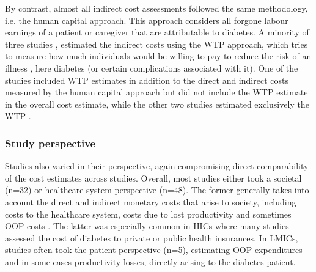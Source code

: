 By contrast, almost all indirect cost assessments followed the same methodology, i.e. the human capital approach. This approach considers all forgone labour earnings of a patient or caregiver that are attributable to diabetes. A minority of three studies \parencite{Tharkar2010a,Chang2010b,Gyldmark2001}, estimated the indirect costs using the \ac{WTP} approach, which tries to measure how much individuals would be willing to pay to reduce the risk of an illness \parencite{Segel2006}, here diabetes (or certain complications associated with it). One of the studies included \ac{WTP} estimates in addition to the direct and indirect costs measured by the human capital approach \parencite{Tharkar2010a}\DIFaddbegin \DIFadd{, }\DIFaddend but did not include the \ac{WTP} estimate in the overall cost estimate, while the other two studies estimated exclusively the \ac{WTP} \parencite{Chang2010b,Gyldmark2001}.


\subsubsection{Study perspective}
Studies also varied in their perspective, again compromising direct comparability of the cost estimates across studies. Overall, most studies either took a societal (n=32) or healthcare system perspective (n=48). The former generally takes into account the direct and indirect monetary costs that arise to society, including costs to the healthcare system, costs due to lost productivity and sometimes \ac{OOP} costs \parencite{Segel2006}. The latter was especially common in \acp{HIC} where many studies assessed the cost of diabetes to private or public health insurances. In \acp{LMIC}, studies often took the patient perspective (n=5), estimating \ac{OOP} expenditures and in some cases productivity losses, directly arising to the diabetes patient.


